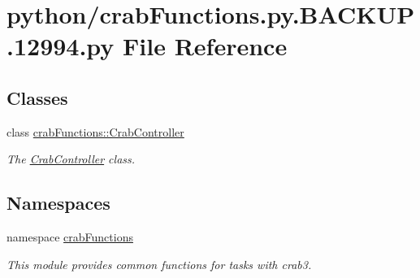 \section{python/crabFunctions.py.BACKUP.12994.py File Reference}
\label{crabFunctions_8py_8BACKUP_812994_8py}
\subsection*{Classes}
\begin{DoxyCompactItemize}
\item 
class \hyperlink{classcrabFunctions_1_1CrabController}{crabFunctions::CrabController}
\begin{DoxyCompactList}\small\item\em The \hyperlink{classcrabFunctions_1_1CrabController}{CrabController} class. \item\end{DoxyCompactList}\end{DoxyCompactItemize}
\subsection*{Namespaces}
\begin{DoxyCompactItemize}
\item 
namespace \hyperlink{namespacecrabFunctions}{crabFunctions}


\begin{DoxyCompactList}\small\item\em This module provides common functions for tasks with crab3. \item\end{DoxyCompactList}\end{DoxyCompactItemize}
